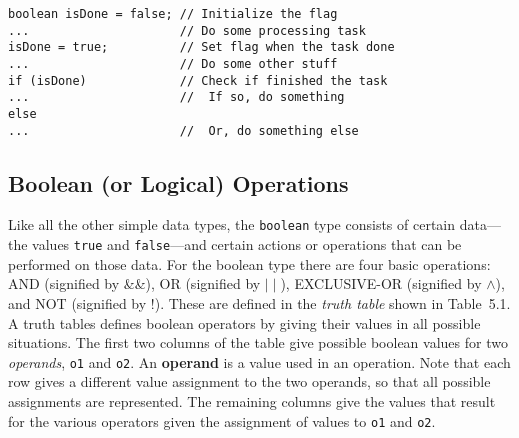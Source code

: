 \begin{jjjlisting}
\begin{lstlisting}
boolean isDone = false; // Initialize the flag
...                     // Do some processing task
isDone = true;          // Set flag when the task done
...                     // Do some other stuff
if (isDone)             // Check if finished the task
...                     //  If so, do something
else
...                     //  Or, do something else
\end{lstlisting}
\end{jjjlisting}

\subsection{Boolean (or Logical) Operations}
\noindent Like all the other simple data types, the {\tt boolean} type consists
of certain data---the values {\tt true} and {\tt false}---and certain
actions or operations that can be performed on those data.  For the
boolean type there are four basic operations: AND (signified by \&\&),
OR (signified by $\mid\mid$), EXCLUSIVE-OR (signified by $\wedge$),
and NOT (signified by !).  These are defined in the {\em truth table}
shown in Table~5.1. A truth tables defines boolean operators by giving
their values in all possible situations. The first two columns of the
table give possible boolean values for two {\it operands}, {\tt o1}
and {\tt o2}. An {\bf operand} is a value used in an operation. Note
that each row gives a different value assignment to the two operands,
so that all possible assignments are represented. The remaining
columns give the values that result for the various operators given
the assignment of values to {\tt o1} and {\tt o2}.

